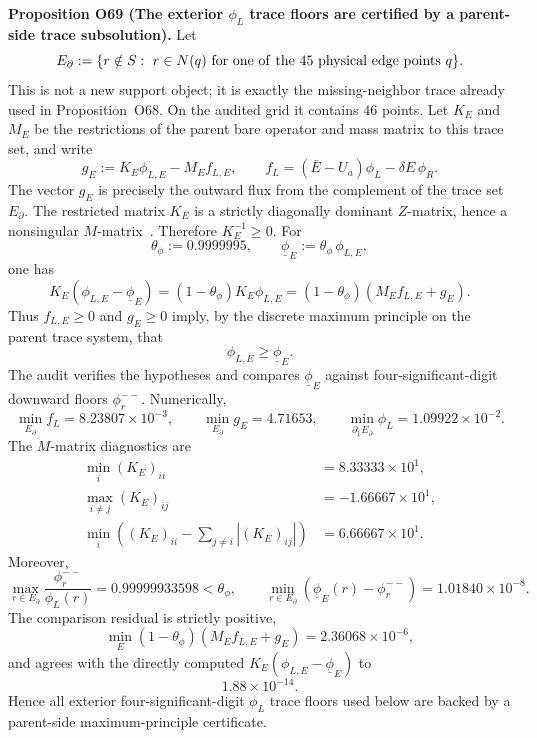 \documentclass[aps,prd,onecolumn,notitlepage,nofootinbib,superscriptaddress,11pt,floatfix]{revtex4-2}
\begin{document}
\medskip\noindent\textbf{Proposition O69 (The exterior \(\phi_L\) trace floors are certified by a parent-side trace subsolution).}
Let
\[
E_\partial:=
\{r\notin S:\ r\in N(q)\ {\rm for\ one\ of\ the\ }45\ {\rm physical\ edge\ points}\ q\}.
\]
This is not a new support object; it is exactly the missing-neighbor trace already used in Proposition~O68.  On the audited grid it contains \(46\) points.  Let \(K_E\) and \(M_E\) be the restrictions of the parent bare operator and mass matrix to this trace set, and write
\[
g_E:=K_E\phi_{L,E}-M_E f_{L,E},
\qquad
f_L=(\bar E-U_a)\phi_L-\delta E\,\phi_R.
\]
The vector \(g_E\) is precisely the outward flux from the complement of the trace set \(E_\partial\).  The restricted matrix \(K_E\) is a strictly diagonally dominant \(Z\)-matrix, hence a nonsingular \(M\)-matrix~\cite{Varga2000}.  Therefore \(K_E^{-1}\ge0\).  For
\[
\theta_\phi:=0.9999995,
\qquad
\underline\phi_E:=\theta_\phi\,\phi_{L,E},
\]
one has
\[
K_E(\phi_{L,E}-\underline\phi_E)
=(1-\theta_\phi)K_E\phi_{L,E}
=(1-\theta_\phi)(M_Ef_{L,E}+g_E).
\]
Thus \(f_{L,E}\ge0\) and \(g_E\ge0\) imply, by the discrete maximum principle on the parent trace system, that
\[
\phi_{L,E}\ge\underline\phi_E.
\]
The audit
verifies the hypotheses and compares \(\underline\phi_E\) against four-significant-digit downward floors \(\phi_r^{--}\).  Numerically,
\[
\min_{E_\partial} f_L=8.23807\times10^{-3},
\qquad
\min_{E_\partial} g_E=4.71653,
\qquad
\min_{\partial_1E_\partial}\phi_L=1.09922\times10^{-2}.
\]
The \(M\)-matrix diagnostics are
\[
\begin{aligned}
\min_i (K_E)_{ii}&=8.33333\times10^1,\\
\max_{i\ne j}(K_E)_{ij}&=-1.66667\times10^1,\\
\min_i\left((K_E)_{ii}-\sum_{j\ne i}|(K_E)_{ij}|\right)&=6.66667\times10^1.
\end{aligned}
\]
Moreover,
\[
\max_{r\in E_\partial}\frac{\phi_r^{--}}{\phi_L(r)}
=0.99999933598
<\theta_\phi,
\qquad
\min_{r\in E_\partial}(\underline\phi_E(r)-\phi_r^{--})
=1.01840\times10^{-8}.
\]
The comparison residual is strictly positive,
\[
\min_E(1-\theta_\phi)(M_Ef_{L,E}+g_E)=2.36068\times10^{-6},
\]
and agrees with the directly computed \(K_E(\phi_{L,E}-\underline\phi_E)\) to
\[
1.88\times10^{-14}.
\]
Hence all exterior four-significant-digit \(\phi_L\) trace floors used below are backed by a parent-side maximum-principle certificate.
\end{document}

